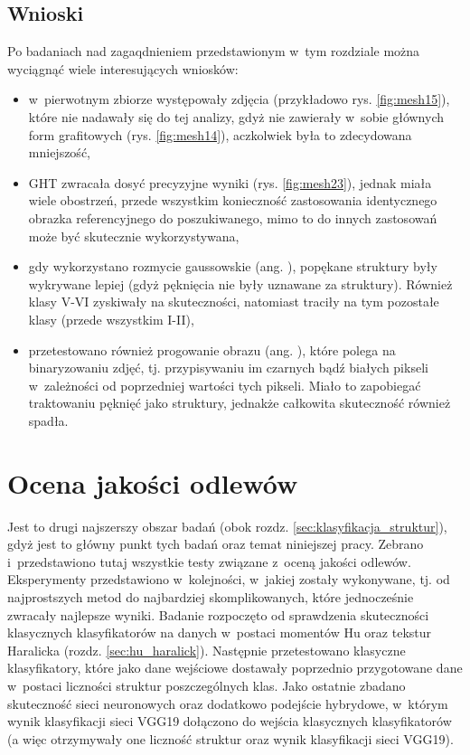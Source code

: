 \subsection{Wnioski}
\label{klasyfikacja.struktur.wnioski}

Po badaniach nad zagaqdnieniem przedstawionym w~tym rozdziale można wyciągnąć wiele interesujących wniosków:
\begin{itemize}
	\item w~pierwotnym zbiorze występowały zdjęcia (przykładowo rys. \ref{fig:mesh15}), które nie nadawały się do tej analizy, gdyż nie zawierały w~sobie głównych form grafitowych (rys. \ref{fig:mesh14}), aczkolwiek była to zdecydowana mniejszość,
	\item GHT zwracała dosyć precyzyjne wyniki (rys. \ref{fig:mesh23}), jednak miała wiele obostrzeń, przede wszystkim konieczność zastosowania identycznego obrazka referencyjnego do poszukiwanego, mimo to do innych zastosowań może być skutecznie wykorzystywana,
	\item gdy wykorzystano rozmycie gaussowskie (ang. ), popękane struktury były wykrywane lepiej (gdyż pęknięcia nie były uznawane za struktury). Również klasy V-VI zyskiwały na skuteczności, natomiast traciły na tym pozostałe klasy (przede wszystkim I-II),
	\item przetestowano również progowanie obrazu (ang. ), które polega na binaryzowaniu zdjęć, tj. przypisywaniu im czarnych bądź białych pikseli w~zależności od poprzedniej wartości tych pikseli. Miało to zapobiegać traktowaniu pęknięć jako struktury, jednakże całkowita skuteczność również spadła.
\end{itemize}

\section{Ocena jakości odlewów}
\label{Ocena jakości odlewów}

Jest to drugi najszerszy obszar badań (obok rozdz. \ref{sec:klasyfikacja_struktur}), gdyż jest to główny punkt tych badań oraz temat niniejszej pracy. Zebrano i~przedstawiono tutaj wszystkie testy związane z~oceną jakości odlewów. Eksperymenty przedstawiono w~kolejności, w~jakiej zostały wykonywane, tj. od najprostszych metod do najbardziej skomplikowanych, które jednocześnie zwracały najlepsze wyniki. Badanie rozpoczęto od sprawdzenia skuteczności klasycznych klasyfikatorów na danych w~postaci momentów Hu oraz tekstur Haralicka (rozdz. \ref{sec:hu_haralick}). Następnie przetestowano klasyczne klasyfikatory, które jako dane wejściowe dostawały poprzednio przygotowane dane w~postaci liczności struktur poszczególnych klas. Jako ostatnie zbadano skuteczność sieci neuronowych oraz dodatkowo podejście hybrydowe, w~którym wynik klasyfikacji sieci VGG19 dołączono do wejścia klasycznych klasyfikatorów (a więc otrzymywały one liczność struktur oraz wynik klasyfikacji sieci VGG19). 

